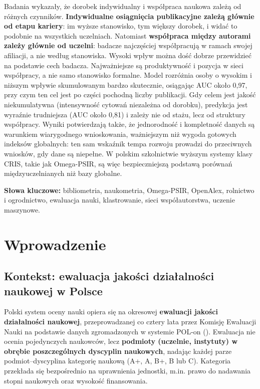 \documentclass[
  polish,
  12pt,
  a4paper,
]{article}
\begin{document}
Badania wykazały, że dorobek indywidualny i współpraca naukowa zależą od
różnych czynników. \textbf{Indywidualne osiągnięcia publikacyjne zależą
głównie od etapu kariery}: im wyższe stanowisko, tym większy dorobek, i
widać to podobnie na wszystkich uczelniach. Natomiast \textbf{współpraca
między autorami zależy głównie od uczelni}: badacze najczęściej
współpracują w ramach swojej afiliacji, a nie według stanowiska. Wysoki
wpływ można dość dobrze przewidzieć na podstawie cech badacza.
Najważniejsze są produktywność i pozycja w sieci współpracy, a nie samo
stanowisko formalne. Model rozróżnia osoby o wysokim i niższym wpływie
skumulowanym bardzo skutecznie, osiągając AUC około 0,97, przy czym ten
cel jest po części pochodną liczby publikacji. Gdy celem jest jakość
niekumulatywna (intensywność cytowań niezależna od dorobku), predykcja
jest wyraźnie trudniejsza (AUC około 0,81) i zależy nie od stażu, lecz
od struktury współpracy. Wyniki potwierdzają także, że jednorodność i
kompletność danych są warunkiem wiarygodnego wnioskowania, ważniejszym
niż wygoda gotowych indeksów globalnych: ten sam wskaźnik tempa rozwoju
prowadzi do przeciwnych wniosków, gdy dane są niepełne. W polskim
szkolnictwie wyższym systemy klasy CRIS, takie jak Omega-PSIR, są więc
bezpieczniejszą podstawą porównań międzyuczelnianych niż bazy globalne.

\textbf{Słowa kluczowe:} bibliometria, naukometria, Omega-PSIR,
OpenAlex, rolnictwo i ogrodnictwo, ewaluacja nauki, klastrowanie, sieci
współautorstwa, uczenie maszynowe.

\newpage{}

\section{Wprowadzenie}\label{wprowadzenie}

\subsection{Kontekst: ewaluacja jakości działalności naukowej w
Polsce}\label{kontekst-ewaluacja-jakoux15bci-dziaux142alnoux15bci-naukowej-w-polsce}

Polski system oceny nauki opiera się na okresowej \textbf{ewaluacji
jakości działalności naukowej}, przeprowadzanej co cztery lata przez
Komisję Ewaluacji Nauki na podstawie danych zgromadzonych w systemie
POL-on (). Ewaluacja nie ocenia pojedynczych naukowców, lecz
\textbf{podmioty (uczelnie, instytuty) w obrębie poszczególnych
dyscyplin naukowych}, nadając każdej parze podmiot--dyscyplina kategorię
naukową (A+, A, B+, B lub C). Kategoria przekłada się bezpośrednio na
uprawnienia jednostki, m.in. prawo do nadawania stopni naukowych oraz
wysokość finansowania.
\end{document}
